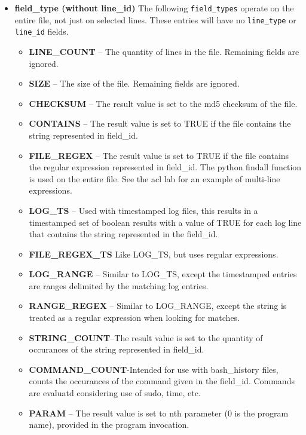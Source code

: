 \documentclass[12pt]{article}
\begin{document}
\begin{itemize}
\item \textbf{field\_type (without line\_id)} The following {\tt field\_types} operate on the entire file, not just on selected lines.  These entries will have
no {\tt line\_type} or {\tt line\_id} fields.
\begin{itemize}
\item \textbf{LINE\_COUNT} -- The quantity of lines in the file. Remaining fields 
                             are ignored.
\item \textbf{SIZE} -- The size of the file. Remaining fields 
                             are ignored.
\item \textbf{CHECKSUM}   -- The result value is set to the md5 checksum 
                             of the file.
\item \textbf{CONTAINS}   -- The result value is set to TRUE if the file 
                             contains the string represented in field\_id.
\item \textbf{FILE\_REGEX} -- The result value is set to TRUE if the file 
                             contains the regular expression represented in field\_id.
                             The python findall function is used on the entire file.
                             See the acl lab for an example of multi-line expressions.
\item \textbf{LOG\_TS}     -- Used with timestamped log files, this results in a 
                             timestamped set of boolean results with a value
                             of TRUE for each log line that contains the string 
                             represented in the field\_id.
\item \textbf{FILE\_REGEX\_TS} Like LOG\_TS, but uses regular expressions.
\item \textbf{LOG\_RANGE}  -- Similar to LOG\_TS, except the timestamped entries
                             are ranges delimited by the matching log entries.
\item \textbf{RANGE\_REGEX}  -- Similar to LOG\_RANGE, except the string is treated
                             as a regular expression when looking for matches.
\item \textbf{STRING\_COUNT}--The result value is set to the quantity of
                             occurances of the string represented in field\_id.
\item \textbf{COMMAND\_COUNT}-Intended for use with bash\_history files, counts
                             the occurances of the command given in the field\_id.
                             Commands are evaluatd considering use of sudo, time, etc.
\item \textbf{PARAM}      -- The result value is set to nth parameter
                             (0 is the program name), provided in the 
                             program invocation.  
                             

\end{itemize}
\end{itemize}
\end{document}
